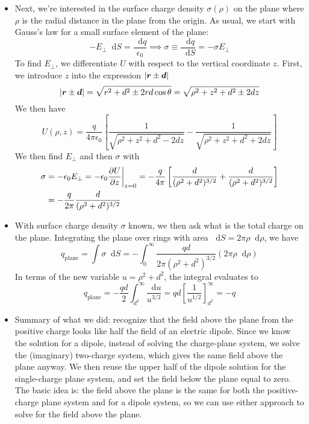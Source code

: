 \documentclass[11pt, a4paper]{article}
\newcommand{\diff}{\mathop{}\!\mathrm{d}} %
\renewcommand{\vec}[1]{\bm{#1}} %
\renewcommand{\r}{\vec{r}}
\newcommand{\e}{\epsilon_{0}}  %
\begin{document}
\begin{itemize}
	\item Next, we're interested in the surface charge density $ \sigma(\rho) $ on the plane where $ \rho $ is the radial distance in the plane from the origin. As usual, we start with Gauss's law for a small surface element of the plane: 
	\begin{equation*}
		-E_{\perp}\diff S = \frac{\diff q}{\e} \implies \sigma \equiv \frac{\diff q}{\diff S} =  -\sigma E_{\perp}
	\end{equation*}
	To find $ E_{\perp} $, we differentiate $ U $ with respect to the vertical coordinate $ z $. First, we introduce $ z $ into the expression $ \abs{\r \pm \vec{d}} $
	\begin{equation*}
		\abs{\r \pm \vec{d}} = \sqrt{r^{2}+d^{2} \pm 2rd\cos \theta} = \sqrt{\rho^{2} + z^{2} + d^{2} \pm 2dz}
	\end{equation*}
	We then have
	\begin{equation*}
		U(\rho, z) = \frac{q}{4\pi \e}\left[\frac{1}{\sqrt{\rho^{2} + z^{2} + d^{2} - 2dz}} - \frac{1}{\sqrt{\rho^{2} + z^{2} + d^{2} + 2dz}}\right]
	\end{equation*}
	We then find $ E_{\perp} $ and then $ \sigma $ with
	\begin{align*}
		\sigma &= - \e E_{\perp} = -\e \pdv{U}{z}\bigg|_{z=0} = -\frac{q}{4\pi}\left[\frac{d}{(\rho^{2}+d^{2})^{3/2}} +  \frac{d}{(\rho^{2}+d^{2})^{3/2}} \right]\\
		& = -\frac{q}{2\pi} \frac{d}{(\rho^{2}+d^{2})^{3/2}}
	\end{align*}
	
	\item With surface charge density $ \sigma $ known, we then ask what is the total charge on the plane. Integrating the plane over rings with area $ \diff S = 2\pi \rho \diff \rho $, we have
	\begin{equation*}
		q_{\text{plane}} = \int \sigma \diff S = - \int_{0}^{\infty} \frac{qd}{2\pi(\rho^{2}+d^{2})^{3/2}} (2\pi \rho \diff \rho)
	\end{equation*}
	In terms of the new variable $ u = \rho^{2} + d^{2} $, the integral evaluates to
	\begin{equation*}
		q_{\text{plane}} = -\frac{qd}{2}\int_{d^{2}}^{\infty}\frac{\diff u}{u^{3/2}} = qd \left[\frac{1}{u^{1/2}}\right]_{d^{2}}^{\infty} = -q
	\end{equation*}
	
	\item Summary of what we did: recognize that the field above the plane from the positive charge looks like half the field of an electric dipole. Since we know the solution for a dipole, instead of solving the charge-plane system, we solve the (imaginary) two-charge system, which gives the same field above the plane anyway. We then reuse the upper half of the dipole solution for the single-charge plane system, and set the field below the plane equal to zero. The basic idea is: the field above the plane is the same for both the positive-charge plane system and for a dipole system, so we can use either approach to solve for the field above the plane. 
	

\end{itemize}
\end{document}
